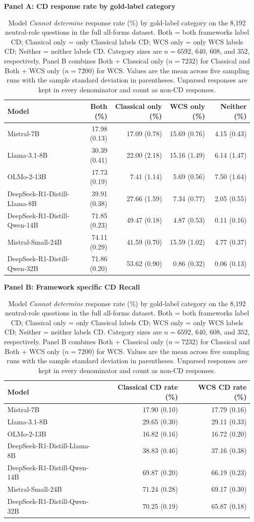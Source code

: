 \begin{table}[H]
\centering
\setlength{\tabcolsep}{3pt}
\caption{Model \emph{Cannot determine} response rate (\%) by gold-label category on the 8,192 neutral-role questions in the full all-forms dataset. Both = both frameworks label CD; Classical only = only Classical labels CD; WCS only = only WCS labels CD; Neither = neither labels CD. Category sizes are $n=6592$, $640$, $608$, and $352$, respectively. Panel B combines Both + Classical only ($n=7232$) for Classical and Both + WCS only ($n=7200$) for WCS. Values are the mean across five sampling runs with the sample standard deviation in parentheses. Unparsed responses are kept in every denominator and count as non-CD responses.}
\label{tab:cannot-determine-per-frameworks-final2}
\textbf{Panel A: CD response rate by gold-label category}\\
\par\vspace{4pt}
\begin{tabular}{lrrrr}
\toprule
Model & Both (\%) & Classical only (\%) & WCS only (\%) & Neither (\%) \\
\midrule
Mistral-7B & 17.98 (0.13) & 17.09 (0.78) & 15.69 (0.76) & 4.15 (0.43) \\
Llama-3.1-8B & 30.39 (0.41) & 22.00 (2.18) & 15.16 (1.49) & 6.14 (1.47) \\
OLMo-2-13B & 17.73 (0.19) & 7.41 (1.14) & 5.69 (0.56) & 7.50 (1.64) \\
DeepSeek-R1-Distill-Llama-8B & 39.91 (0.38) & 27.66 (1.59) & 7.34 (0.77) & 2.05 (0.55) \\
DeepSeek-R1-Distill-Qwen-14B & 71.85 (0.23) & 49.47 (0.18) & 4.87 (0.53) & 0.11 (0.16) \\
Mistral-Small-24B & 74.11 (0.29) & 41.59 (0.70) & 15.59 (1.02) & 4.77 (0.37) \\
DeepSeek-R1-Distill-Qwen-32B & 71.86 (0.20) & 53.62 (0.90) & 0.86 (0.32) & 0.06 (0.13) \\
\bottomrule
\end{tabular}
\vspace{4pt}

\textbf{Panel B: Framework specific CD Recall}\\
\par\vspace{4pt}
\begin{tabular}{lrr}
\toprule
Model & Classical CD rate (\%) & WCS CD rate (\%) \\
\midrule
Mistral-7B & 17.90 (0.10) & 17.79 (0.16) \\
Llama-3.1-8B & 29.65 (0.30) & 29.11 (0.33) \\
OLMo-2-13B & 16.82 (0.16) & 16.72 (0.20) \\
DeepSeek-R1-Distill-Llama-8B & 38.83 (0.46) & 37.16 (0.38) \\
DeepSeek-R1-Distill-Qwen-14B & 69.87 (0.20) & 66.19 (0.23) \\
Mistral-Small-24B & 71.24 (0.28) & 69.17 (0.30) \\
DeepSeek-R1-Distill-Qwen-32B & 70.25 (0.19) & 65.87 (0.18) \\
\bottomrule
\end{tabular}
\end{table}
